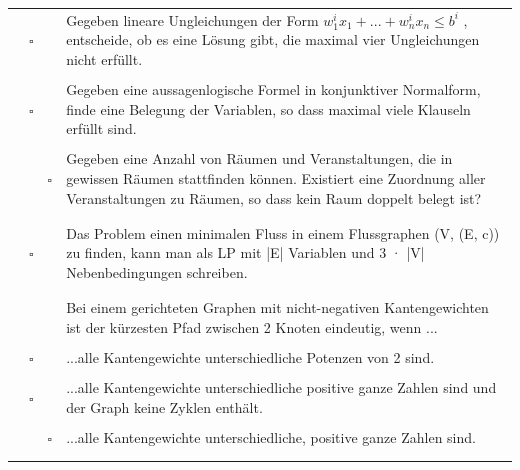 \documentclass{article}
\newcommand{\checkedbox}[0]{\makebox[0pt][l]{$\square$}\raisebox{.15ex}{\hspace{0.1em}$\checkmark$}}
\begin{document}
\begin{longtable}[H]
\begin{tabular}{ | p{1cm} | c c | p{13cm} |}
     \cite{nachklausur19} & $\square$ &  \checkedbox  &  Gegeben lineare Ungleichungen der Form $w_1^ix_1+...+w_n^i x_n \leq b^i$ , entscheide, ob es eine Lösung gibt, die maximal vier Ungleichungen nicht erfüllt. \\ & & & \\
     
     \cite{nachklausur19}& $\square$ & \checkedbox  & Gegeben eine aussagenlogische Formel in konjunktiver Normalform\index{Normalform!konjunktive}, finde eine Belegung der Variablen, so dass maximal viele Klauseln erfüllt sind.  \\& & & \\
     
     \cite{probeklausur21}\cite{probeklausur24} & \checkedbox &  $\square$  &  Gegeben eine Anzahl von Räumen und Veranstaltungen, die in gewissen Räumen stattfinden können. Existiert eine Zuordnung aller Veranstaltungen zu Räumen, so dass kein Raum doppelt belegt ist? \\ & & & \\\hline \hline & & & \\  
     
     \cite{probeklausur21}\cite{probeklausur24} & $\square$ &  \checkedbox  &  Das Problem einen minimalen Fluss\index{Fluss!minimaler} in einem Flussgraphen\index{Flussgraph} (V, (E, c)) zu finden, kann man als\index{LP} LP mit |E| Variablen und 3 · |V| Nebenbedingungen\index{Nebenbedingungen} schreiben. \\ & & & \\\hline \hline & & & \\
     
     & & & Bei einem gerichteten Graphen mit nicht-negativen Kantengewichten ist der kürzesten Pfad zwischen 2 Knoten eindeutig, wenn ... \\ & & & \\
     
     \cite{probeklausur24}\cite{hauptklausur21} & $\square$ & \checkedbox &  ...alle Kantengewichte unterschiedliche Potenzen von 2 sind. \\ & & & \\
     \cite{probeklausur24}& $\square$ &  \checkedbox & ...alle Kantengewichte unterschiedliche positive ganze Zahlen sind
und der Graph keine Zyklen enthält. \\ & & & \\

    \cite{hauptklausur21}& \checkedbox &  $\square$  & ...alle Kantengewichte unterschiedliche, positive ganze Zahlen sind. \\ & & & \\ \hline \hline & & & \\ 
    
    \end{tabular}
    \label{tab:mutiple_choice}
\end{longtable}
\end{document}
